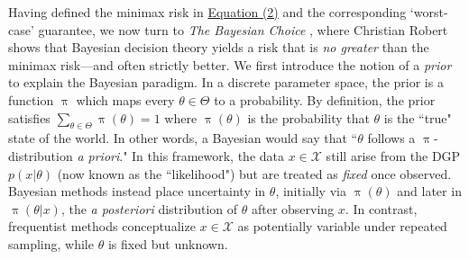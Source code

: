 \documentclass[letterpaper,12pt]{article}
\newcommand{\given}{|}
\begin{document}
Having defined the minimax risk in \hyperref[eq:minimaxrisk]{Equation (2)} and the corresponding `worst-case' guarantee, we now turn to \textit{The Bayesian Choice} \cite{robert2007bayesian}, where Christian Robert shows that Bayesian decision theory yields a risk that is \textit{no greater} than the minimax risk—and often strictly better. We first introduce the notion of a \textit{prior} to explain the Bayesian paradigm. In a discrete parameter space, the prior is a function $\uppi$ which maps every $\theta \in \Theta$ to a probability. By definition, the prior satisfies $\sum_{\theta \in \Theta} \uppi (\theta) = 1$ where $\uppi(\theta)$ is the probability that $\theta$ is the ``true" state of the world. In other words, a Bayesian would say that ``$\theta$ follows a $\uppi$-distribution \textit{a priori}." In this framework, the data $x \in \mathcal{X}$ still arise from the DGP $p(x \given \theta)$ (now known as the ``likelihood") but are treated as \textit{fixed} once observed. Bayesian methods instead place uncertainty in $\theta$, initially via $\uppi(\theta)$ and later in $\uppi(\theta \given x)$, the \textit{a posteriori} distribution of $\theta$ after observing $x$. In contrast, frequentist methods conceptualize $x \in \mathcal{X}$ as potentially variable under repeated sampling, while $\theta$ is fixed but unknown.
\end{document}
